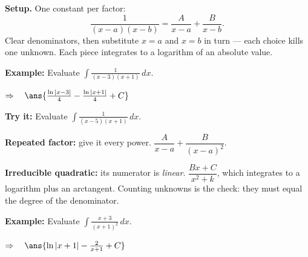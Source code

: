 \documentclass[12pt]{article}
\begin{document}


\begin{formulabox}
\textbf{Setup.} One constant per factor:
\[ \frac{1}{(x - a)(x - b)} = \frac{A}{x - a} + \frac{B}{x - b}. \]
Clear denominators, then substitute $x = a$ and $x = b$ in turn --- each choice
kills one unknown. Each piece integrates to a logarithm of an absolute value.
\end{formulabox}

\begin{examplebox}
\textbf{Example:} \quad Evaluate $\displaystyle\int \frac{1}{(x - 3)(x + 1)}\,dx$.

$\Rightarrow\quad \ans{\frac{\ln|x-3|}{4} - \frac{\ln|x+1|}{4} + C}$
\end{examplebox}

\begin{tryitbox}
\textbf{Try it:} \quad Evaluate $\displaystyle\int \frac{1}{(x - 5)(x + 1)}\,dx$.\\[2pt]
\end{tryitbox}


\begin{formulabox}
\textbf{Repeated factor:} give it every power.
$\dfrac{A}{x - a} + \dfrac{B}{(x - a)^2}$.\par
\textbf{Irreducible quadratic:} its numerator is \emph{linear}.
$\dfrac{Bx + C}{x^2 + k}$, which integrates to a logarithm plus an arctangent.
Counting unknowns is the check: they must equal the degree of the denominator.
\end{formulabox}

\begin{examplebox}
\textbf{Example:} \quad Evaluate $\displaystyle\int \frac{x + 3}{(x + 1)^2}\,dx$.

$\Rightarrow\quad \ans{\ln|x+1| - \frac{2}{x+1} + C}$
\end{examplebox}
\end{document}
